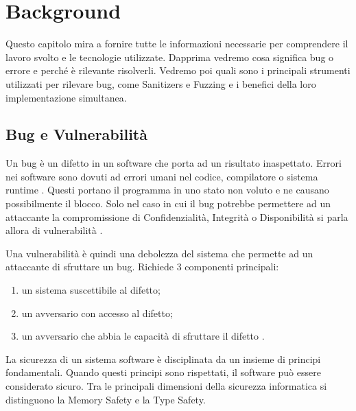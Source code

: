 \chapter{Background}

Questo capitolo mira a fornire tutte le informazioni necessarie per comprendere il lavoro svolto e le tecnologie utilizzate.  Dapprima vedremo cosa significa bug o errore e perché è rilevante risolverli. Vedremo poi quali sono i principali strumenti utilizzati per rilevare bug, come Sanitizers e Fuzzing e i benefici della loro implementazione simultanea. 

\section{Bug e Vulnerabilità}

Un bug è un difetto in un software che porta ad un risultato inaspettato. Errori nei software sono dovuti ad errori umani nel codice, compilatore o sistema runtime \cite{ref3}. Questi portano il programma in uno stato non voluto e ne causano possibilmente il blocco. Solo nel caso in cui il bug potrebbe permettere ad un attaccante la compromissione di Confidenzialità, Integrità o Disponibilità si parla allora di vulnerabilità \cite{ref1}.

Una vulnerabilità è quindi una debolezza del sistema che permette ad un attaccante di sfruttare un bug. Richiede 3 componenti principali: 
\begin{enumerate}
    \item un sistema suscettibile al difetto;
    \item un avversario con accesso al difetto;
    \item un avversario che abbia le capacità di sfruttare il difetto \cite{ref1}. 
\end{enumerate}

La sicurezza di un sistema software è disciplinata da un insieme di principi fondamentali. Quando questi principi sono rispettati, il software può essere considerato sicuro. Tra le principali dimensioni della sicurezza informatica si distinguono la Memory Safety e la Type Safety.

